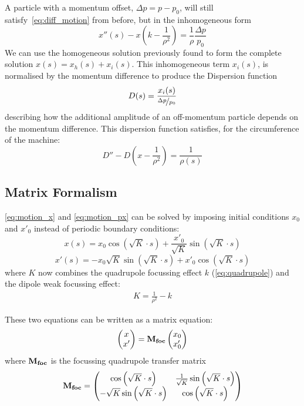 \documentclass[a4paper,twoside,11pt]{report}
\begin{document}
A particle with a momentum offset, $\Delta p = p-p_0$, will still satisfy~\ref{eq:diff_motion} from before, but in the inhomogeneous form
\begin{equation}
  x''(s)-x\left(k-\frac 1{\rho^2}\right)=\frac 1\rho\frac{\Delta p}{p_0}
\end{equation}
We can use the homogeneous solution previously found to form the complete solution $x(s)=x_h(s)+x_i(s)$. This inhomogeneous term $x_i(s)$, is normalised by the momentum difference to produce the Dispersion function
\begin{equation}
  D(s)=\frac{x_i(s)}{\nicefrac{\Delta p}{p_0}}
  \label{eq:dispersion}
\end{equation} describing how the additional amplitude of an off-momentum particle depends on the momentum difference. 
This dispersion function satisfies, for the circumference of the machine:
\begin{equation}
  D''-D\left(x-\frac1{\rho^2}\right)=\frac 1{\rho(s)}
\end{equation}

\subsection{Matrix Formalism}\label{sec:matrix}

\autoref{eq:motion_x} and \autoref{eq:motion_px} can be solved by imposing initial conditions $x_0$ and $x'_0$ instead of periodic boundary conditions:
\begin{equation}
  x(s)=x_0\cos\left(\sqrt{K}\cdot s\right)+\frac{x'_0}{\sqrt{K}}\sin\left(\sqrt{K}\cdot s\right)
\end{equation}
\begin{equation}
  x'(s)=-x_0\sqrt{K}\sin\left(\sqrt{K}\cdot s\right)+x'_0\cos\left(\sqrt{K}\cdot s\right)
\end{equation}
where $K$ now combines the quadrupole focussing effect $k$ (\autoref{eq:quadrupole}) and the dipole weak focussing effect:
\begin{eqnarray}
  K=\frac1{\rho^2}-k
\end{eqnarray}

These two equations can be written as a matrix equation:
\begin{equation}
  \begin{pmatrix}
    x \\
    x'
  \end{pmatrix}
  =
  \bf{M_{foc}}
  \begin{pmatrix}
    x_0 \\
    x'_0
  \end{pmatrix}
\end{equation}
where $\bf{M_{foc}}$ is the focussing quadrupole transfer matrix~\cite{Hillert:2107.02614}
\begin{equation}
  \bf{M_{foc}}=
  \begin{pmatrix}
    \cos\left(\sqrt{K}\cdot s\right) & \frac1{\sqrt{K}}\sin\left(\sqrt{K}\cdot s\right) \\
    -\sqrt{K}\sin\left(\sqrt{K}\cdot s\right) & \cos\left(\sqrt{K}\cdot s\right)
  \end{pmatrix}
\end{equation}
\end{document}
